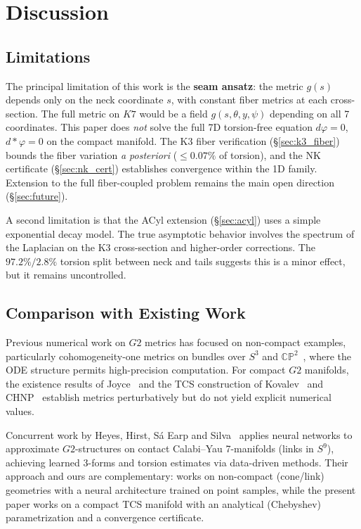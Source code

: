 \documentclass[11pt,a4paper]{article}
\newcommand{\Gtwo}{\mathrm{G}_2}
\newcommand{\Kseven}{K_7}
\theoremstyle{remark}
\def\Gtwo{G2}%
\def\Kseven{K7}%
\begin{document}
\section{Discussion}\label{sec:discussion}

\subsection{Limitations}\label{sec:limitations}

The principal limitation of this work is the \textbf{seam ansatz}: the metric $g(s)$ depends
only on the neck coordinate $s$, with constant fiber metrics at each cross-section. The
full metric on $\Kseven$ would be a field $g(s, \theta, y, \psi)$ depending on all 7 coordinates.
This paper does \textit{not} solve the full 7D torsion-free equation $d\varphi = 0$, $d{*}\varphi = 0$ on
the compact manifold. The K3 fiber verification (\S\ref{sec:k3_fiber}) bounds the fiber variation
\textit{a posteriori} ($\leq 0.07\%$ of torsion), and the NK certificate (\S\ref{sec:nk_cert}) establishes
convergence within the 1D family. Extension to the full fiber-coupled problem
remains the main open direction (\S\ref{sec:future}).

A second limitation is that the ACyl extension (\S\ref{sec:acyl}) uses a simple exponential decay model. The true
asymptotic behavior involves the spectrum of the Laplacian on the K3 cross-section
and higher-order corrections. The $97.2\% / 2.8\%$ torsion split between neck and tails
suggests this is a minor effect, but it remains uncontrolled.

\subsection{Comparison with Existing Work}\label{sec:comparison}

Previous numerical work on $\Gtwo$ metrics has focused on non-compact examples, particularly
cohomogeneity-one metrics on bundles over $S^3$ and $\mathbb{CP}^2$~\cite{brandhuber2001}, where the ODE structure
permits high-precision computation. For compact $\Gtwo$ manifolds, the existence results
of Joyce~\cite{joyce1996, joyce2000} and the TCS construction of Kovalev~\cite{kovalev2003} and CHNP~\cite{chnp2015} establish metrics
perturbatively but do not yield explicit numerical values.

Concurrent work by Heyes, Hirst, S\'a Earp and Silva~\cite{heyes2026} applies neural networks to
approximate $\Gtwo$-structures on contact Calabi--Yau 7-manifolds (links in $S^9$), achieving
learned 3-forms and torsion estimates via data-driven methods. Their approach and ours
are complementary: \cite{heyes2026} works on non-compact (cone/link) geometries with a neural
architecture trained on point samples, while the present paper works on a compact TCS
manifold with an analytical (Chebyshev) parametrization and a convergence certificate.
\end{document}

